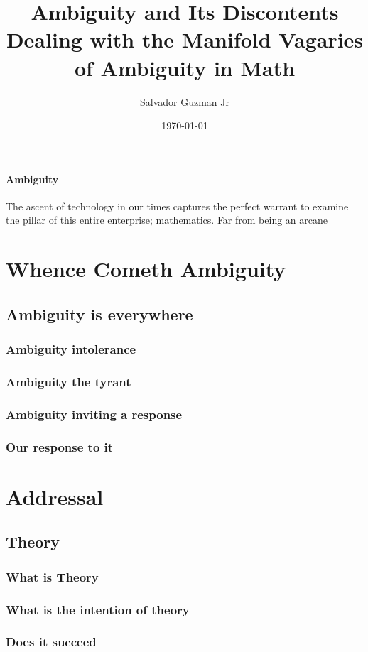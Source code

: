 \documentclass[UTF8]{article}
\title{%
	Ambiguity and Its Discontents\\
	\large Dealing with the Manifold Vagaries of Ambiguity in Math
}
\author{Salvador Guzman Jr}
\date{\today}
\begin{document}
	\maketitle
	\tableofcontents
	
	\paragraph{Ambiguity}
	The ascent of technology in our times captures the perfect warrant to examine the pillar of this entire enterprise; mathematics. Far from being an arcane 
	
	\section{Whence Cometh Ambiguity}
		\subsection{Ambiguity is everywhere}
			\subsubsection{Ambiguity intolerance}
			\subsubsection{Ambiguity the tyrant}
			\subsubsection{Ambiguity inviting a response}
			\subsubsection{Our response to it}
	\section{Addressal}
		\subsection{Theory}
			\subsubsection{What is Theory}
			\subsubsection{What is the intention of theory}
			\subsubsection{Does it succeed}
\end{document}

